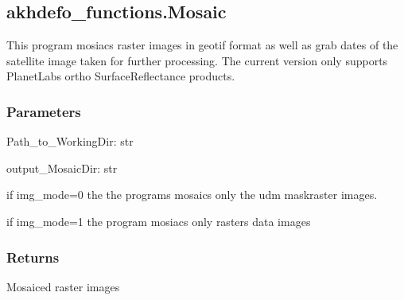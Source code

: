 \documentclass[letterpaper,10pt]{sphinxmanual}
\begin{document}
\sphinxstepscope


\subsection{akhdefo\_functions.Mosaic}
\label{\detokenize{generated/akhdefo_functions.Mosaic:akhdefo-functions-mosaic}}\label{\detokenize{generated/akhdefo_functions.Mosaic::doc}}

\begin{fulllineitems}
\label{\detokenize{generated/akhdefo_functions.Mosaic:akhdefo_functions.Mosaic}}
\pysigstartsignatures
{}
\pysigstopsignatures
\sphinxAtStartPar
This program mosiacs raster images in geotif format as well as grab dates of the satellite image taken for further processing. 
The current version only supports PlanetLabs ortho SurfaceReflectance products.


\subsubsection{Parameters}
\label{\detokenize{generated/akhdefo_functions.Mosaic:parameters}}
\sphinxAtStartPar
Path\_to\_WorkingDir: str

\sphinxAtStartPar
output\_MosaicDir: str
\begin{description}
\sphinxAtStartPar
if img\_mode=0 the the programs mosaics only the udm maskraster images.

\sphinxAtStartPar
if img\_mode=1 the program mosiacs only  rasters data images

\end{description}


\subsubsection{Returns}
\label{\detokenize{generated/akhdefo_functions.Mosaic:returns}}
\sphinxAtStartPar
Mosaiced raster images

\end{fulllineitems}
\end{document}
